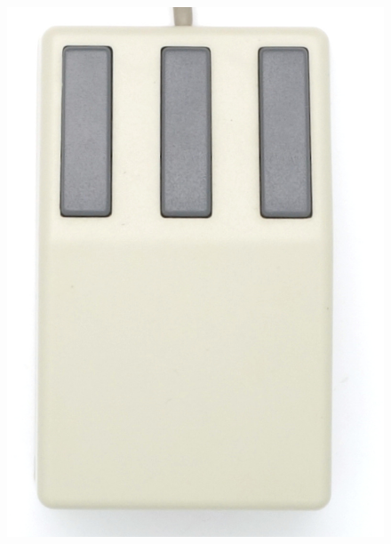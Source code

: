 \documentclass[11pt, a4paper]{article}
\begin{document}
\begin{figure}[h]
    \centering
    \includegraphics[scale=0.8]{1987_genius_gm5_mouse/top_30.jpg}

\end{figure}
\end{document}
